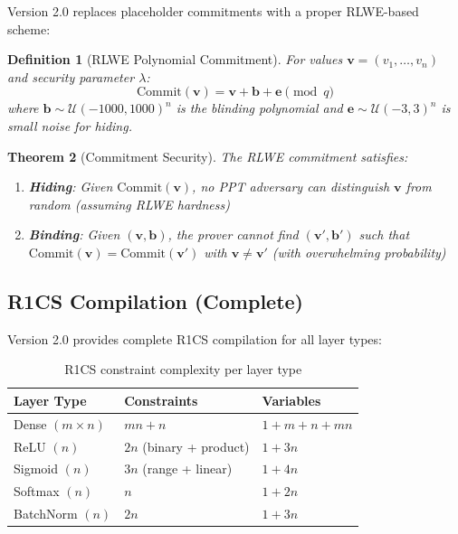 \documentclass[11pt,a4paper]{article}
\newtheorem{theorem}{Theorem}[section]
\newtheorem{definition}[theorem]{Definition}
\begin{document}
Version 2.0 replaces placeholder commitments with a proper RLWE-based scheme:

\begin{definition}[RLWE Polynomial Commitment]
For values $\mathbf{v} = (v_1, \ldots, v_n)$ and security parameter $\lambda$:
\begin{equation}
\text{Commit}(\mathbf{v}) = \mathbf{v} + \mathbf{b} + \mathbf{e} \pmod{q}
\end{equation}
where $\mathbf{b} \sim \mathcal{U}(-1000, 1000)^n$ is the blinding polynomial and $\mathbf{e} \sim \mathcal{U}(-3, 3)^n$ is small noise for hiding.
\end{definition}

\begin{theorem}[Commitment Security]
The RLWE commitment satisfies:
\begin{enumerate}
    \item \textbf{Hiding}: Given $\text{Commit}(\mathbf{v})$, no PPT adversary can distinguish $\mathbf{v}$ from random (assuming RLWE hardness)
    \item \textbf{Binding}: Given $(\mathbf{v}, \mathbf{b})$, the prover cannot find $(\mathbf{v}', \mathbf{b}')$ such that $\text{Commit}(\mathbf{v}) = \text{Commit}(\mathbf{v}')$ with $\mathbf{v} \neq \mathbf{v}'$ (with overwhelming probability)
\end{enumerate}
\end{theorem}

\subsection{R1CS Compilation (Complete)}

Version 2.0 provides complete R1CS compilation for all layer types:

\begin{table}[h]
\centering
\begin{tabular}{lll}
\toprule
\textbf{Layer Type} & \textbf{Constraints} & \textbf{Variables} \\
\midrule
Dense $(m \times n)$ & $mn + n$ & $1 + m + n + mn$ \\
ReLU $(n)$ & $2n$ (binary + product) & $1 + 3n$ \\
Sigmoid $(n)$ & $3n$ (range + linear) & $1 + 4n$ \\
Softmax $(n)$ & $n$ & $1 + 2n$ \\
BatchNorm $(n)$ & $2n$ & $1 + 3n$ \\
\bottomrule
\end{tabular}
\caption{R1CS constraint complexity per layer type}
\end{table}
\end{document}
